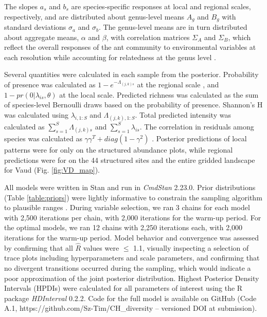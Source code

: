 \documentclass[preprint,final,times,12pt,3p]{elsarticle}
\begin{document}
The slopes $a_s$ and $b_s$ are species-specific responses at local and regional scales, respectively, and are distributed about genus-level means $A_g$ and $B_g$ with standard deviations $\sigma_a$ and $\sigma_b$. The genus-level means are in turn distributed about aggregate means, $\alpha$ and $\beta$, with correlation matrices $\Sigma_A$ and $\Sigma_B$, which reflect the overall responses of the ant community to environmental variables at each resolution while accounting for relatedness at the genus level \citep{Hadfield2010b,Ovaskainen2011,Szewczyk2018,Caradima2019}.

Several quantities were calculated in each sample from the posterior. Probability of presence was calculated as $1 - e^{-\Lambda_{(j,k)s}}$ at the regional scale \citep{Hefley2016}, and $1 - pr(0 | \lambda_{is}, \theta)$ at the local scale. Predicted richness was calculated as the sum of species-level Bernoulli draws based on the probability of presence. Shannon's H was calculated using $\lambda_{i,1:S}$ and $\Lambda_{(j,k),1:S}$. Total predicted intensity was calculated as $\sum_{s=1}^{S}\Lambda_{(j,k)s}$ and $\sum_{s=1}^{S}\lambda_{is}$. The correlation in residuals among species was calculated as $\gamma \gamma^T + diag(1 - \gamma^2)$ \citep{Tobler2019}. Posterior predictions of local patterns were for only on the structured abundance plots, while regional predictions were for on the 44 structured sites and the entire gridded landscape for Vaud (Fig. \ref{fig:VD_map}). 

All models were written in Stan \citep{Carpenter2017} and run in \emph{CmdStan} 2.23.0. Prior distributions (Table \ref{table:priors}) were lightly informative to constrain the sampling algorithm to plausible ranges \citep{Carpenter2017,Lemoine2019}. During variable selection, we ran 3 chains for each model with 2,500 iterations per chain, with 2,000 iterations for the warm-up period. For the optimal models, we ran 12 chains with 2,250 iterations each, with 2,000 iterations for the warm-up period. Model behavior and convergence was assessed by confirming that all $\hat{R}$ values were $\leq$ 1.1, visually inspecting a selection of trace plots including hyperparameters and scale parameters, and confirming that no divergent transitions occurred during the sampling, which would indicate a poor approximation of the joint posterior distribution. Highest Posterior Density Intervals (HPDIs) were calculated for all parameters of interest using the R package \emph{HDInterval} 0.2.2. Code for the full model is available on GitHub (Code A.1, https://github.com/Sz-Tim/CH\_diversity -- versioned DOI at submission).
\end{document}
